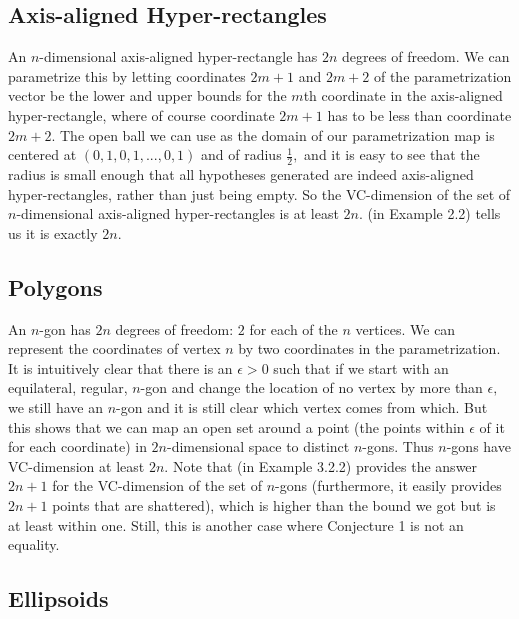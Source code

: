 \documentclass[12pt]{amsart}
\newcommand{\0}{\mat{0}}
\newcommand{\1}{\mathds{1}}
\begin{document}
\subsection{Axis-aligned Hyper-rectangles}

An $n$-dimensional axis-aligned hyper-rectangle has $2n$ degrees of freedom. We can parametrize this by letting coordinates $2m + 1$ and $2m + 2$ of the parametrization vector be the lower and upper bounds for the $m$th coordinate in the axis-aligned hyper-rectangle, where of course coordinate $2m + 1$ has to be less than coordinate $2m + 2.$ The open ball we can use as the domain of our parametrization map is centered at $(0, 1, 0, 1, ..., 0, 1)$ and of radius $\frac{1}{2},$ and it is easy to see that the radius is small enough that all hypotheses generated are indeed axis-aligned hyper-rectangles, rather than just being empty. So the VC-dimension of the set of $n$-dimensional axis-aligned hyper-rectangles is at least $2n.$ \citep{rectangles-ngons} (in Example 2.2) tells us it is exactly $2n.$

\subsection{Polygons}

An $n$-gon has $2n$ degrees of freedom: $2$ for each of the $n$ vertices. We can represent the coordinates of vertex $n$ by two coordinates in the parametrization. It is intuitively clear that there is an $\epsilon > 0$ such that if we start with an equilateral, regular, $n$-gon and change the location of no vertex by more than $\epsilon,$ we still have an $n$-gon and it is still clear which vertex comes from which. But this shows that we can map an open set around a point (the points within $\epsilon$ of it for each coordinate) in $2n$-dimensional space to distinct $n$-gons. Thus $n$-gons have VC-dimension at least $2n.$ Note that \citep{rectangles-ngons} (in Example 3.2.2) provides the answer $2n + 1$ for the VC-dimension of the set of $n$-gons (furthermore, it easily provides $2n + 1$ points that are shattered), which is higher than the bound we got but is at least within one. Still, this is another case where Conjecture 1 is not an equality.

\subsection{Ellipsoids}
\end{document}
